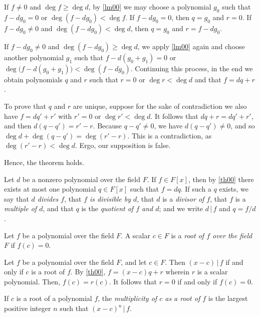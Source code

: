   If \(f \neq 0\) and \(\deg f \geq \deg d\), by \autoref{lm00} we may choose a polynomial \(g_0\) such that \(f - d g_0
  = 0\) or \(\deg (f - d g_0) < \deg f\). If \(f - d g_0 = 0\), then \(q = g_0\) and \(r = 0\). If \(f - d g_0 \neq 0\)
  and \(\deg (f - d g_0) < \deg d\), then \(q = g_0\) and \(r = f - d g_0\).

  If \(f - d g_0 \neq 0\) and \(\deg (f - d g_0) \geq \deg d\), we apply \autoref{lm00} again and choose another
  polynomial \(g_1\) such that \(f - d (g_0 + g_1) = 0\) or \(\deg \big(f - d (g_0 + g_1)\big) < \deg (f - d g_0)\).
  Continuing this process, in the end we obtain polynomials \(q\) and \(r\) such that \(r = 0\) or \(\deg r < \deg d\)
  and that \(f = d q + r\).

  To prove that \(q\) and \(r\) are unique, suppose for the sake of contradiction we also have \(f = d q' + r'\) with
  \(r' = 0\) or \(\deg r' < \deg d\). It follows that \(d q + r = d q' + r'\), and then \(d (q - q') = r' - r\). Because
  \(q - q' \neq 0\), we have \(d (q - q') \neq 0\), and so \(\deg d + \deg (q - q') = \deg (r' - r)\). This is a
  contradiction, as \(\deg (r' - r) < \deg d\). Ergo, our supposition is false.

  Hence, the theorem holds.
\Epr

\Bdf
  Let \(d\) be a nonzero polynomial over the field \(F\). If \(f \in F[x]\), then by \autoref{th00} there exists at most
  one polynomial \(q \in F[x]\) such that \(f = d q\). If such a \(q\) exists, we say that \emph{\(d\) divides \(f\)},
  that \emph{\(f\) is divisible by \(d\)}, that \(d\) is a \emph{divisor of \(f\)}, that \(f\) is a \emph{multiple of
  \(d\)}, and that \(q\) is the \emph{quotient of \(f\) and \(d\)}; and we write \(d \, | \, f\) and \(q = f / d\).
\Edf

\Bdf
  Let \(f\) be a polynomial over the field \(F\). A scalar \(c \in F\) is a \emph{root of \(f\) over the field \(F\)} if
  \(f(c) = 0\).
\Edf

\Bcr
  Let \(f\) be a polynomial over the field \(F\), and let \(c \in F\). Then \((x - c) \, | \, f\) if and only if \(c\)
  is a root of \(f\).
\Ecr
\Bpr
  By \autoref{th00}, \(f = (x - c) q + r\) wherein \(r\) is a scalar polynomial. Then, \(f(c) = r(c)\). It follows that
  \(r = 0\) if and only if \(f(c) = 0\).
\Epr

If \(c\) is a root of a polynomial \(f\), the \emph{multiplicity of \(c\) as a root of \(f\)} is the largest positive
integer \(n\) such that \((x - c)^n \, | \, f\).

